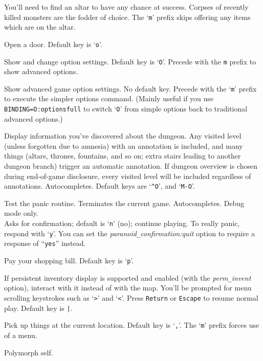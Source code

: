 You'll need to find an altar to have any chance at success.
Corpses of recently killed monsters are the fodder of choice.
The `{\tt m}' prefix skips offering any items which are on the altar.\\
\item[\tb{\#open}]
Open a door. Default key is `{\tt o}'.
\item[\tb{\#options}]
Show and change option settings. Default key is `{\tt O}'.
Precede with the {\tt m} prefix to show advanced options.
\item[\tb{\#optionsfull}]
Show advanced game option settings.
No default key.
Precede with the `{\tt m}' prefix to execute the simpler options command.
(Mainly useful if you use {\tt BINDING=O:optionsfull} to switch
`{\tt O}' from simple options back to traditional advanced options.)
\item[\tb{\#overview}]
Display information you've discovered about the dungeon.  Any visited
level (unless forgotten due to amnesia) with an annotation is included,
and many things (altars, thrones, fountains, and so on; extra stairs
leading to another dungeon branch) trigger an automatic annotation.
If dungeon overview is chosen during end-of-game disclosure, every visited
level will be included regardless of annotations. Autocompletes.
Default keys are `{\tt \^{}O}', and `{\tt M-O}'.
\item[\tb{\#panic}]
Test the panic routine.
Terminates the current game.
Autocompletes.
Debug mode only.\\
Asks for confirmation; default is `{\tt n}' (no); continue playing.
To really panic, respond with `{\tt y}'.
You can set the
{\it paranoid\verb+_+confirmation:quit\/}
option to require a response of ``{\tt yes}'' instead.
\item[\tb{\#pay}]
Pay your shopping bill. Default key is `{\tt p}'.
\item[\tb{\#perminv}]
If persistent inventory display is supported and enabled (with the
{\it perm\verb+_+invent\/} option), interact with it instead of with the map.
You'll be prompted for menu scrolling keystrokes such
as `{\tt \verb+>+}' and `{\tt \verb+<+}'.
Press {\tt Return} or {\tt Escape} to resume normal play.
Default key is {\tt \verb+|+}.
\item[\tb{\#pickup}]
Pick up things at the current location. Default key is `{\tt ,}'.
The `{\tt m}' prefix forces use of a menu.
\item[\tb{\#polyself}]
Polymorph self.

